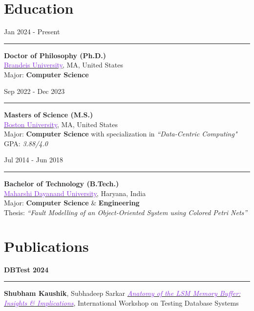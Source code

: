 \documentclass[10pt,a4paper,calibri]{moderncv}
\newcommand{\beforesection}{\vspace{-0.5em}}
\newcommand{\mediumspace}{\vspace{0.5em}}
\newcommand{\education}[2]{
  \noindent
  \begin{minipage}[c]{0.20\textwidth}
    \hfill
    #1
  \end{minipage}%
  \hspace{0.01\textwidth}
  \begin{minipage}[c]{0.02\textwidth}
    \textcolor{lightgray}{\rule{1pt}{1.6cm}}
  \end{minipage}%
  \begin{minipage}[c]{0.80\textwidth}
    \raggedright{
    #2
    }
  \end{minipage}%
}
\newcommand{\publications}[2]{
  \noindent
  \begin{minipage}[c]{0.15\textwidth}
    \centering
      \textbf{#1}
  \end{minipage}%
  \hspace{0.01\textwidth}
  \begin{minipage}[c]{0.02\textwidth}
    \textcolor{lightgray}{\rule{1pt}{0.75cm}}
  \end{minipage}%
  \begin{minipage}[c]{0.80\textwidth}
    \raggedright{
    #2
    }
  \end{minipage}%
}
\begin{document}
\beforesection

\section{Education}
\noindent
\begin{minipage}[c]{0.20\textwidth}
  \hfill
  Jan 2024 \-- Present
\end{minipage}%
\hspace{0.01\textwidth}
\begin{minipage}[c]{0.02\textwidth}
  \textcolor{lightgray}{\rule{1pt}{1.2cm}}
\end{minipage}%
\begin{minipage}[c]{0.80\textwidth}
  \raggedright{
    \textbf{Doctor of Philosophy (Ph.D.)}\\
    \href{https://www.brandeis.edu/}{\textcolor{blueviolet}{Brandeis University}}, MA, United States\\
    Major: \textbf{Computer Science}\\
  }
\end{minipage}%

\mediumspace

\education{Sep 2022 \-- Dec 2023}
{
  \textbf{Masters of Science (M.S.)}\\
  \href{https://www.bu.edu/}{\textcolor{blueviolet}{Boston University}}, MA, United States\\
  Major: \textbf{Computer Science} with specialization in \textit{“Data-Centric Computing"}\\
  GPA: \textit{3.88/4.0}
}

\mediumspace

\education{Jul 2014 \-- Jun 2018}
{
  \textbf{Bachelor of Technology (B.Tech.)}\\
  \href{https://mdu.ac.in/}{\textcolor{blueviolet}{Maharshi Dayanand University}}, Haryana, India\\
  Major: \textbf{Computer Science} \& \textbf{Engineering}\\
  Thesis: \textit{“Fault Modelling of an Object-Oriented System using Colored Petri Nets”}\\
}

\beforesection

\section{Publications}
\publications{DBTest 2024}{\textbf{Shubham Kaushik}, Subhadeep Sarkar \href{https://doi.org/10.1145/3662165.3662766}{\textit{\textcolor{blueviolet}{Anatomy 
of the LSM Memory Buffer: Insights \& Implications}}}, International Workshop on Testing Database Systems}
\end{document}
